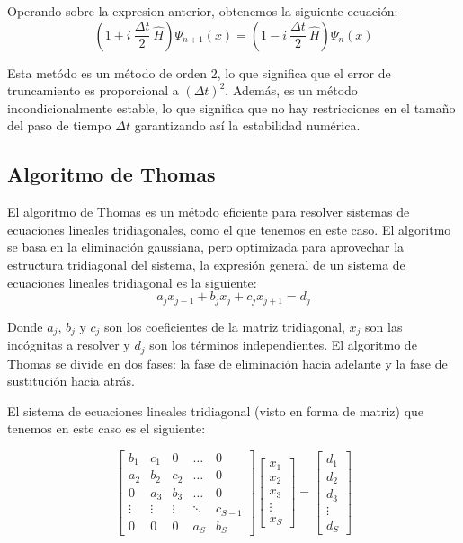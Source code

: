 \documentclass[10pt,onecolumn]{article}
\begin{document}
Operando sobre la expresion anterior, obtenemos la siguiente ecuación:
\begin{equation}
    (1 + i\ \dfrac{\Delta t}{2}\ \hat{H})\Psi_{n+1}(x) = (1 - i\ \dfrac{\Delta t}{2}\ \hat{H})\Psi_n(x)
\end{equation}

Esta metódo es un método de orden 2, lo que significa que el error de truncamiento es proporcional a $(\Delta t)^2$. Además, es un método incondicionalmente estable, lo que significa que no hay restricciones en el tamaño del paso de tiempo $\Delta t$  garantizando así la estabilidad numérica.

\subsection{Algoritmo de Thomas}

El algoritmo de Thomas es un método eficiente para resolver sistemas de ecuaciones lineales tridiagonales, como el que tenemos en este caso. El algoritmo se basa en la eliminación gaussiana, pero optimizada para aprovechar la estructura tridiagonal del sistema, la expresión general de un sistema de ecuaciones lineales tridiagonal es la siguiente:
\begin{equation}
    a_j x_{j-1} + b_j x_j + c_j x_{j+1} = d_j
\end{equation}

Donde $a_j$, $b_j$ y $c_j$ son los coeficientes de la matriz tridiagonal, $x_j$ son las incógnitas a resolver y $d_j$ son los términos independientes. El algoritmo de Thomas se divide en dos fases: la fase de eliminación hacia adelante y la fase de sustitución hacia atrás.

El sistema de ecuaciones lineales tridiagonal (visto en forma de matriz) que tenemos en este caso es el siguiente:

\begin{equation}
    \begin{bmatrix}
    b_1 & c_1 & 0 & \ldots & 0 \\
    a_2 & b_2 & c_2 & \ldots & 0 \\
    0 & a_3 & b_3 & \ldots & 0 \\
    \vdots & \vdots & \vdots & \ddots & c_{S-1} \\
    0 & 0 & 0 & a_S & b_S
    \end{bmatrix}
    \begin{bmatrix}
    x_1 \\
    x_2 \\
    x_3 \\
    \vdots \\
    x_S
    \end{bmatrix}
    =
    \begin{bmatrix}
    d_1 \\
    d_2 \\
    d_3 \\
    \vdots \\
    d_S
    \end{bmatrix}
\end{equation}
\end{document}

